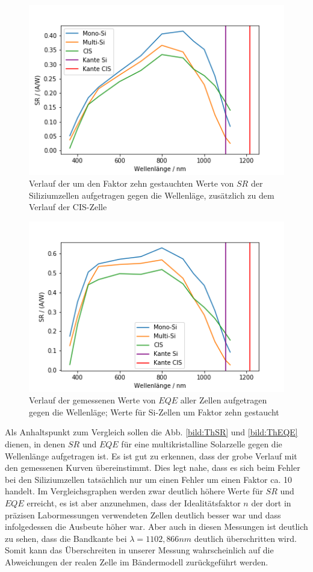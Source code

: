 \begin{figure}[ht]
    \centering
    \includegraphics[scale=0.75]{Bilder/32allSRgest.png}
    \caption{Verlauf der um den Faktor zehn gestauchten Werte von $SR$ der Siliziumzellen aufgetragen gegen die Wellenläge, zusätzlich
    zu dem Verlauf der CIS-Zelle}
    \label{bild:allSRgest}
\end{figure}

\begin{figure}[ht]
    \centering
    \includegraphics[scale=0.75]{Bilder/32allEQEgest.png}
    \caption{Verlauf der gemessenen Werte von $EQE$ aller Zellen aufgetragen gegen die Wellenläge; Werte für Si-Zellen um Faktor
    zehn gestaucht}
    \label{bild:allEQEgest}
\end{figure}

Als Anhaltspunkt zum Vergleich sollen die Abb. \ref{bild:ThSR} und \ref{bild:ThEQE} dienen, in denen $SR$ und $EQE$ für eine multikristalline Solarzelle 
gegen die Wellenlänge aufgetragen ist. Es ist gut zu erkennen, dass der grobe Verlauf mit den gemessenen Kurven übereinstimmt. Dies
legt nahe, dass es sich beim Fehler bei den Siliziumzellen tatsächlich nur um einen Fehler um einen Faktor ca. 10 handelt. Im 
Vergleichsgraphen werden zwar deutlich höhere Werte für $SR$ und $EQE$ erreicht, es ist aber anzunehmen, dass der Idealitätsfaktor $n$ 
der dort in präzisen Labormessungen verwendeten Zellen deutlich besser war und dass infolgedessen die Ausbeute höher war.
Aber auch in diesen Messungen ist deutlich zu sehen, dass die Bandkante bei $\lambda = 1102,866 nm$ deutlich überschritten wird. Somit
kann das Überschreiten in unserer Messung wahrscheinlich auf die Abweichungen der realen Zelle im Bändermodell zurückgeführt werden.

